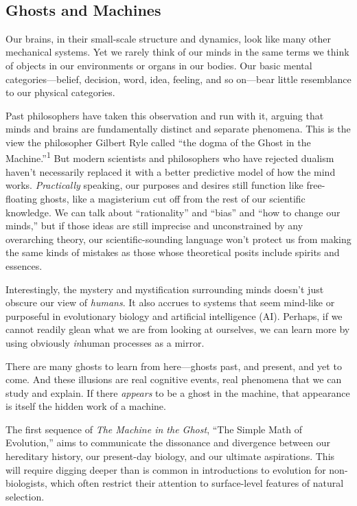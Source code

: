 {
 ~}

\subsection{Ghosts and Machines}

{
 Our brains, in their small-scale structure and dynamics, look like
many other mechanical systems. Yet we rarely think of our minds in the
same terms we think of objects in our environments or organs in our
bodies. Our basic mental categories---belief, decision, word, idea,
feeling, and so on---bear little resemblance to our physical
categories.}

{
 Past philosophers have taken this observation and run with it,
arguing that minds and brains are fundamentally distinct and separate
phenomena. This is the view the philosopher Gilbert Ryle called
``the dogma of the Ghost in the
Machine.''\textsuperscript{1} But modern scientists
and philosophers who have rejected dualism haven't
necessarily replaced it with a better predictive model of how the mind
works. \textit{Practically} speaking, our purposes and desires still
function like free-floating ghosts, like a magisterium cut off from the
rest of our scientific knowledge. We can talk about
``rationality'' and
``bias'' and ``how
to change our minds,'' but if those ideas are still
imprecise and unconstrained by any overarching theory, our
scientific-sounding language won't protect us from
making the same kinds of mistakes as those whose theoretical posits
include spirits and essences.}

{
 Interestingly, the mystery and mystification surrounding minds
doesn't just obscure our view of \textit{humans}. It
also accrues to systems that seem mind-like or purposeful in
evolutionary biology and artificial intelligence (AI). Perhaps, if we
cannot readily glean what we are from looking at ourselves, we can
learn more by using obviously \textit{in}human processes as a mirror.}

{
 There are many ghosts to learn from here---ghosts past, and
present, and yet to come. And these illusions are real cognitive
events, real phenomena that we can study and explain. If there
\textit{appears} to be a ghost in the machine, that appearance is
itself the hidden work of a machine.}

{
 The first sequence of \textit{The Machine in the Ghost},
``The Simple Math of Evolution,''
aims to communicate the dissonance and divergence between our
hereditary history, our present-day biology, and our ultimate
aspirations. This will require digging deeper than is common in
introductions to evolution for non-biologists, which often restrict
their attention to surface-level features of natural selection.}

